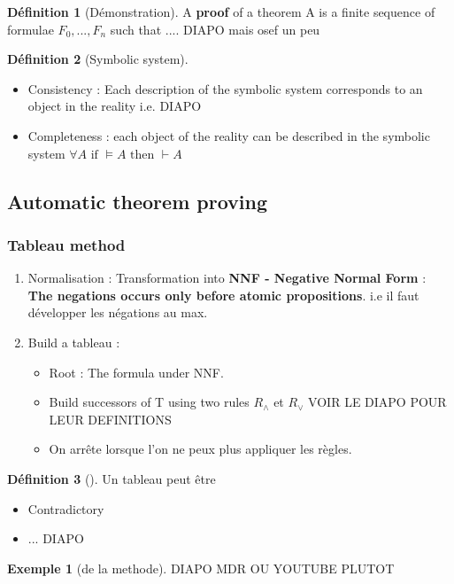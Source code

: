 \documentclass{article}
\theoremstyle{plain}%
\theoremstyle{definition}
\newtheorem{defn}{Définition}[section]
\newtheorem{exmp}{Exemple}[section]
\theoremstyle{remark}
\begin{document}
\begin{defn}[Démonstration]
    A \textbf{proof} of a theorem A is a finite sequence of formulae $ F_0, ..., F_n $ such that .... DIAPO mais osef un peu
\end{defn}

\begin{defn}[Symbolic system]
    \begin{itemize}
        \item Consistency : Each description of the symbolic system corresponds to an object in the reality i.e. DIAPO
        \item Completeness : each object of the reality can be described in the symbolic system $ \forall A \text{ if } \models A \text{ then } \vdash A$ 
    \end{itemize}
\end{defn}

\subsection{Automatic theorem proving}
\subsubsection{Tableau method}
\begin{enumerate}
    \item Normalisation : Transformation into \textbf{NNF - Negative Normal Form} : \textbf{The negations occurs only before atomic propositions}. i.e il faut développer les négations au max.
    \item Build a tableau : \begin{itemize}
        \item Root : The formula under NNF.
        \item Build successors of T using two rules $ R_{\wedge } $ et $ R_{\vee } $ VOIR LE DIAPO POUR LEUR DEFINITIONS
        \item On arrête lorsque l'on ne peux plus appliquer les règles.
    \end{itemize}
\end{enumerate}
\begin{defn}[]
    Un tableau peut être \begin{itemize}
        \item Contradictory 
        \item ... DIAPO 
    \end{itemize}
\end{defn}
\begin{exmp}[de la methode]
    DIAPO MDR OU YOUTUBE PLUTOT
\end{exmp}
\end{document}
